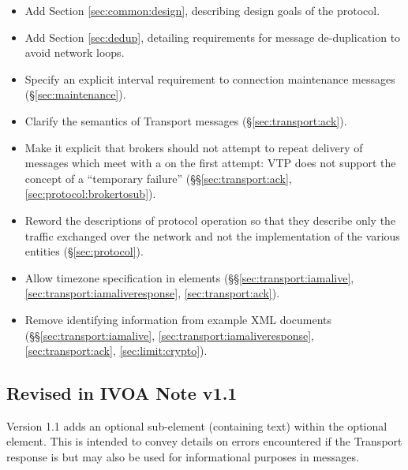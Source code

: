 \documentclass[a4paper,11pt]{ivoa}
\begin{document}
\begin{itemize}
    \item{Add Section \ref{sec:common:design}, describing design goals of the
    protocol.}

    \item{Add Section \ref{sec:dedup}, detailing requirements for message
    de-duplication to avoid network loops.}

    \item{Specify an explicit interval requirement to connection maintenance
    messages (\S\ref{sec:maintenance}).}

    \item{Clarify the semantics of  Transport messages
    (\S\ref{sec:transport:ack}).}

    \item{Make it explicit that brokers should not attempt to repeat delivery
    of messages which meet with a  on the first attempt: VTP does
    not support the concept of a ``temporary failure''
    (\S\S\ref{sec:transport:ack}, \ref{sec:protocol:brokertosub}).}

    \item{Reword the descriptions of protocol operation so that they describe
    only the traffic exchanged over the network and not the implementation of
    the various entities (\S\ref{sec:protocol}).}

    \item{Allow timezone specification in 
     elements (\S\S\ref{sec:transport:iamalive},
    \ref{sec:transport:iamaliveresponse}, \ref{sec:transport:ack}).}

    \item{Remove identifying information from example XML documents
    (\S\S\ref{sec:transport:iamalive}, \ref{sec:transport:iamaliveresponse},
    \ref{sec:transport:ack}, \ref{sec:limit:crypto}).}
\end{itemize}

\subsection{Revised in IVOA Note v1.1}

Version 1.1 adds an optional  sub-element (containing text)
within the optional  element. This is intended to convey
details on errors encountered if the Transport response is  but
may also be used for informational purposes in  messages.


\end{document}
